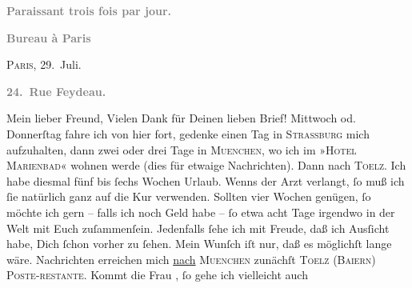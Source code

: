 \begin{ledgroupsized}[t]{13cm}
           \pstart
           \begin{otherlanguage}{french}\textcolor{gray}{\textbf{\textbf{Paraissant trois fois par jour.}}}\end{otherlanguage}\pend
           \pstart
           \begin{otherlanguage}{french}\textcolor{gray}{\textbf{\textbf{Bureau à Paris}}}\end{otherlanguage}\hfill \textsc{Paris}, 29. Juli.\pend
           \pstart
           \begin{otherlanguage}{french}\textcolor{gray}{\textbf{\textbf{24. Rue Feydeau.}}}\end{otherlanguage}\pend
           \pstart\center{}Mein lieber Freund,\pend\pstart
           Vielen Dank für Deinen lieben Brief! \pend
           \pstart
           Mittwoch od. Donnerſtag
               fahre ich von hier fort, gedenke einen Tag in \textsc{Strassburg} mich aufzuhalten, dann zwei oder drei Tage in \textsc{Muenchen}, wo ich im »\textsc{Hotel Marienbad}« wohnen werde (dies für etwaige Nachrichten). Dann nach \textsc{Toelz}. Ich habe diesmal {\pb}fünf bis ſechs Wochen
               Urlaub. Wenns der Arzt verlangt, ſo muß ich ſie natürlich ganz auf die Kur verwenden.
               Sollten vier Wochen genügen, ſo möchte ich gern – falls ich noch Geld habe – ſo etwa
               acht Tage irgendwo in der Welt mit Euch zuſammenſein. Jedenfalls ſehe ich mit Freude,
               daß ich Ausſicht habe, Dich ſchon vorher zu ſehen. Mein Wunſch iſt nur, daß es
               möglichſt lange wäre. Nachrichten erreichen mich {\pb}\uline{nach}{ }\textsc{Muenchen} zunächſt \textsc{Toelz} (\textsc{Baiern}) \textsc{Poste-restante}. Kommt die Frau \label{K_L02742-1v}\label{K_L02742-1h}, ſo gehe ich vielleicht auch

\end{ledgroupsized}

